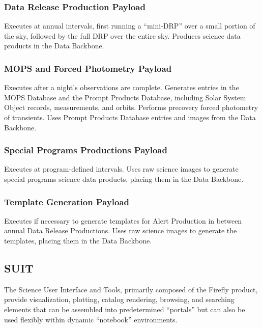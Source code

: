 \documentclass[DM,toc]{lsstdoc}
\begin{document}
\subsubsection{Data Release Production
Payload}\label{data-release-production-payload}

Executes at annual intervals,
first running a ``mini-DRP'' over a small portion of the sky, followed
by the full DRP over the entire sky. Produces science data products in
the Data Backbone.

\subsubsection{MOPS and Forced Photometry Payload}\label{mops-payload}

Executes after a night's
observations are complete. Generates entries in the MOPS Database and
the Prompt Products Database, including Solar System Object records,
measurements, and orbits. Performs precovery forced photometry of
transients. Uses Prompt Products Database entries and images from the Data
Backbone.

\subsubsection{Special Programs Productions
Payload}\label{special-programs-productions-payload}

Executes at program-defined intervals.
Uses raw science images to generate special programs science data products, placing them in the Data Backbone.

\subsubsection{Template Generation
Payload}\label{template-generation-payload}

Executes if necessary to generate templates for Alert Production in between annual
Data Release Productions. Uses raw science images to generate the
templates, placing them in the Data Backbone.

\subsection{SUIT}\label{suit}

The Science User Interface and Tools, primarily composed of the Firefly product, provide visualization, plotting,
catalog rendering, browsing, and searching elements that can be
assembled into predetermined ``portals'' but can also be used flexibly
within dynamic ``notebook'' environments.
\end{document}
